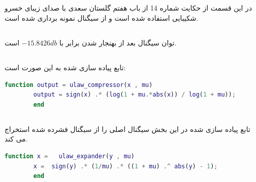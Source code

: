 \documentclass[a4paper]{article}
\begin{document}
	\subsection{}
	در این قسمت از حکایت شماره 14 از باب هفتم گلستان سعدی با صدای زیبای خسرو شکیبایی استفاده شده است و از سیگنال نمونه برداری شده است.
	\subsection{}
	توان سیگنال بعد از بهنجار شدن برابر  با 
	$-15.8426
	db$
	است.
	\subsection{}
	تابع پیاده سازی شده به این صورت است:
\begin{latin*}
	\begin{lstlisting}[language=Matlab]
		function output = ulaw_compressor(x , mu)
		output = sign(x) .* (log(1 + mu.*abs(x)) / log(1 + mu));
		end
	\end{lstlisting}
\end{latin*}
\subsection{}
تابع پیاده سازی شده در این بخش سیگنال اصلی را از سیگنال فشرده شده استخراج می کند.
\begin{latin*}
	\begin{lstlisting}[language=Matlab]
		function x =   ulaw_expander(y , mu)
		x =  sign(y) .* (1/mu) .* ((1 + mu) .^ abs(y) - 1);
		end
	\end{lstlisting}
\end{latin*}
\end{document}
